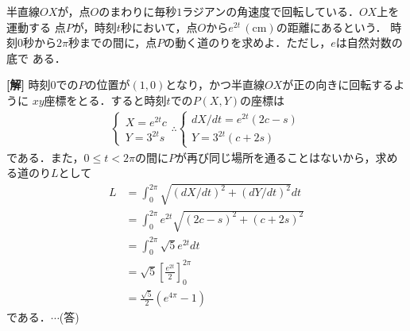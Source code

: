 \documentclass[a4j]{jarticle}
\begin{document}

     \begin{oframed}
     半直線$OX$が，点$O$のまわりに毎秒$1$ラジアンの角速度で回転している．$OX$上を運動する
     点$P$が，時刻$t$秒において，点$O$から$e^{2t}\,\mathrm{(cm)}$の距離にあるという．
     時刻$0$秒から$2\pi$秒までの間に，点$P$の動く道のりを求めよ．ただし，$e$は自然対数の底で
     ある．
     \end{oframed}

\setlength{\columnseprule}{0.4pt}
\begin{multicols}{2}
{\bf[解]}\2 時刻$0$での$P$の位置が$(1,0)$となり，かつ半直線$OX$が正の向きに回転するように
$xy$座標をとる．すると時刻$t$での$P(X,Y)$の座標は
     \begin{align*}
     \left\{
          \begin{array}{l}
          X=e^{2t}c \\
          Y=3^{2t}s
          \end{array}
     \right.
      \therefore \left\{
          \begin{array}{l}
          dX/dt=e^{2t}(2c-s) \\
          Y=3^{2t}(c+2s)
          \end{array}
     \right.
     \end{align*}
である．また，$0\le t<2\pi$の間に$P$が再び同じ場所を通ることはないから，求める道のり$L$として
     \begin{align*}
     L&=\int_0^{2\pi}\sqrt{(dX/dt)^2+(dY/dt)^2}dt \\
     &=\int_0^{2\pi}e^{2t}\sqrt{(2c-s)^2+(c+2s)^2} \\
     &=\int_0^{2\pi}\sqrt{5}e^{2t}dt \\
     &=\sqrt{5}\left[\frac{e^{2t}}{2}\right]_0^{2\pi} \\
     &=\frac{\sqrt{5}}{2}(e^{4\pi}-1)
     \end{align*}
である．$\cdots$(答)    
\newpage
\end{multicols}
\end{document}
